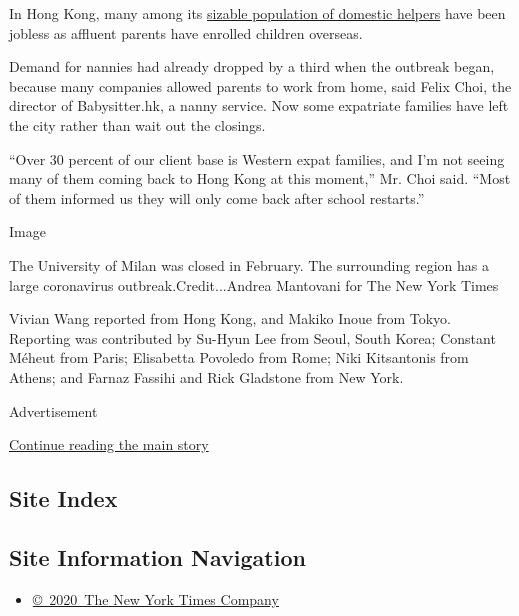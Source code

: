 In Hong Kong, many among its
\href{https://www.legco.gov.hk/research-publications/english/1617rb04-foreign-domestic-helpers-and-evolving-care-duties-in-hong-kong-20170720-e.pdf}{sizable
population of domestic helpers} have been jobless as affluent parents
have enrolled children overseas.

Demand for nannies had already dropped by a third when the outbreak
began, because many companies allowed parents to work from home, said
Felix Choi, the director of Babysitter.hk, a nanny service. Now some
expatriate families have left the city rather than wait out the
closings.

``Over 30 percent of our client base is Western expat families, and I'm
not seeing many of them coming back to Hong Kong at this moment,'' Mr.
Choi said. ``Most of them informed us they will only come back after
school restarts.''

Image

The University of Milan was closed in February. The surrounding region
has a large coronavirus outbreak.Credit...Andrea Mantovani for The New
York Times

Vivian Wang reported from Hong Kong, and Makiko Inoue from Tokyo.
Reporting was contributed by Su-Hyun Lee from Seoul, South Korea;
Constant Méheut from Paris; Elisabetta Povoledo from Rome; Niki
Kitsantonis from Athens; and Farnaz Fassihi and Rick Gladstone from New
York.

Advertisement

\protect\hyperlink{after-bottom}{Continue reading the main story}

\hypertarget{site-index}{%
\subsection{Site Index}\label{site-index}}

\hypertarget{site-information-navigation}{%
\subsection{Site Information
Navigation}\label{site-information-navigation}}

\begin{itemize}
\tightlist
\item
  \href{https://help.nytimes3xbfgragh.onion/hc/en-us/articles/115014792127-Copyright-notice}{©~2020~The
  New York Times Company}
\end{itemize}

